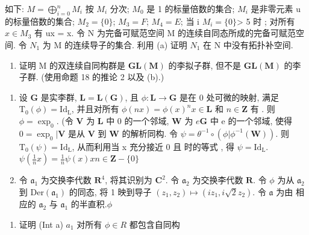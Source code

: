 如下: \(M = \bigoplus_{i=0}^{n} M_{i}\) 按 \(M_{i}\) 分次; \(M_{0}\) 是 1 的标量倍数的集合; \(M_{i}\) 是非零元素 u 的标量倍数的集合; \(M_{2} = \{0\}\); \(M_{3} = F\); \(M_{4} = E\); 当 i \(M_{i} = \{0\}\)\textgreater{} 5 时 ; 对所有 \(x \in M_{3}\) 有 ux = x. 令 N 为完备可赋范空间 M 的连续自同态所成的完备可赋范空间. 令 \(N_{1}\) 为 M 的连续导子的集合. 利用 (a) 证明 \(N_{1}\) 在 N 中没有拓扑补空间.

\begin{enumerate}
\def\labelenumi{(\alph{enumi})}
\setcounter{enumi}{2}
\tightlist
\item
  证明 M 的双连续自同构群是 \(\mathbf{GL}(\mathbf{M})\) 的李拟子群, 但不是 \(\mathbf{GL}(\mathbf{M})\) 的李子群. (使用命题 18 的推论 2 以及 (b).)
\end{enumerate}

\begin{enumerate}
\def\labelenumi{\arabic{enumi}.}
\setcounter{enumi}{12}
\item
  设 \(\mathbf{G}\) 是实李群, \(\mathbf{L} = \mathbf{L}(\mathbf{G})\), 且 \(\phi: \mathbf{L} \to \mathbf{G}\) 是在 0 处可微的映射, 满足 \(\mathrm{T}_0(\phi) = \mathrm{Id}_{\mathrm{L}}\), 并且对所有 \(\phi(nx) = \phi(x)^n\)\(x \in \mathbf{L}\) 和 \(n \in \mathbf{Z}\) 有 . 则 \(\phi = \exp_0\). (令 \(\mathbf{V}\) 为 \(\mathbf{L}\) 中 0 的一个邻域, \(\mathbf{W}\) 为 \(e\)\(\mathbf{G}\) 中 e 的一个邻域, 使得 \(0 = \exp_0 | \mathbf{V}\) 是从 \(\mathbf{V}\) 到 \(\mathbf{W}\) 的解析同构. 令 \(\psi = \theta^{-1} \circ (\phi | \phi^{-1}(\mathbf{W}))\). 则 \(\mathrm{T}_0(\psi) = \mathrm{Id}_{\mathrm{L}}\), 从而利用当 x 充分接近 0 且  时的等式 , 得 \(\psi = \mathrm{Id}_{\mathrm{L}}\).\(\psi\left(\frac{1}{n}x\right) = \frac{1}{n}\psi(x)\)\(x\)\(n \in \mathbf{Z} - \{0\}\)
\item
  令 \(\mathfrak{a}_1\) 为交换李代数 \(\mathbf{R}^4\), 将其识别为 \(\mathbf{C}^2\). 令 \(\mathfrak{a}_2\) 为交换李代数 \(\mathbf{R}\). 令 \(\phi\) 为从 \(\mathfrak{a}_2\) 到 \(\mathrm{Der}(\mathfrak{a}_1)\) 的同态, 将 1 映到导子 \((z_1, z_2) \mapsto (iz_1, i\sqrt{2}z_2)\). 令 \(\mathfrak{a}\) 为由  相应的 \(\mathfrak{a}_2\) 与 \(\mathfrak{a}_1\) 的半直积.\(\phi\)
\end{enumerate}

\begin{enumerate}
\def\labelenumi{(\alph{enumi})}
\tightlist
\item
  证明 (Int a) \textbar{} \(a_{1}\) 对所有 \(\phi \in R\) 都包含自同构
\end{enumerate}

